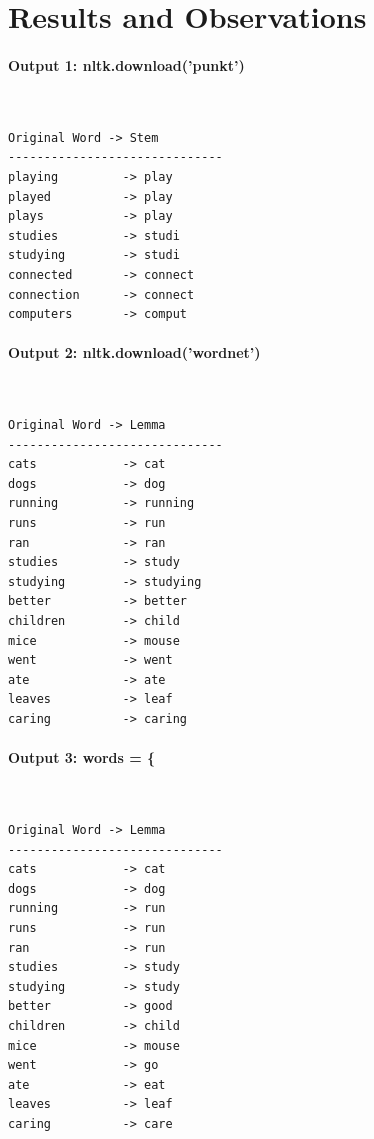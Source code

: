 \documentclass[12pt,a4paper,oneside]{report}
\begin{document}
\section{Results and Observations}
\paragraph{Output 1: nltk.download('punkt')}\mbox{}\\[-1ex]
\begin{Verbatim}[commandchars=\\\{\},breaklines=true,breakanywhere=true,fontsize=\scriptsize,frame=leftline,framesep=2mm,rulecolor=\color{gray}]
Original Word -> Stem
------------------------------
playing         -> play
played          -> play
plays           -> play
studies         -> studi
studying        -> studi
connected       -> connect
connection      -> connect
computers       -> comput
\end{Verbatim}
\paragraph{Output 2: nltk.download('wordnet')}\mbox{}\\[-1ex]
\begin{Verbatim}[commandchars=\\\{\},breaklines=true,breakanywhere=true,fontsize=\scriptsize,frame=leftline,framesep=2mm,rulecolor=\color{gray}]
Original Word -> Lemma
------------------------------
cats            -> cat
dogs            -> dog
running         -> running
runs            -> run
ran             -> ran
studies         -> study
studying        -> studying
better          -> better
children        -> child
mice            -> mouse
went            -> went
ate             -> ate
leaves          -> leaf
caring          -> caring
\end{Verbatim}
\paragraph{Output 3: words = \{}\mbox{}\\[-1ex]
\begin{Verbatim}[commandchars=\\\{\},breaklines=true,breakanywhere=true,fontsize=\scriptsize,frame=leftline,framesep=2mm,rulecolor=\color{gray}]
Original Word -> Lemma
------------------------------
cats            -> cat
dogs            -> dog
running         -> run
runs            -> run
ran             -> run
studies         -> study
studying        -> study
better          -> good
children        -> child
mice            -> mouse
went            -> go
ate             -> eat
leaves          -> leaf
caring          -> care
\end{Verbatim}
\end{document}
